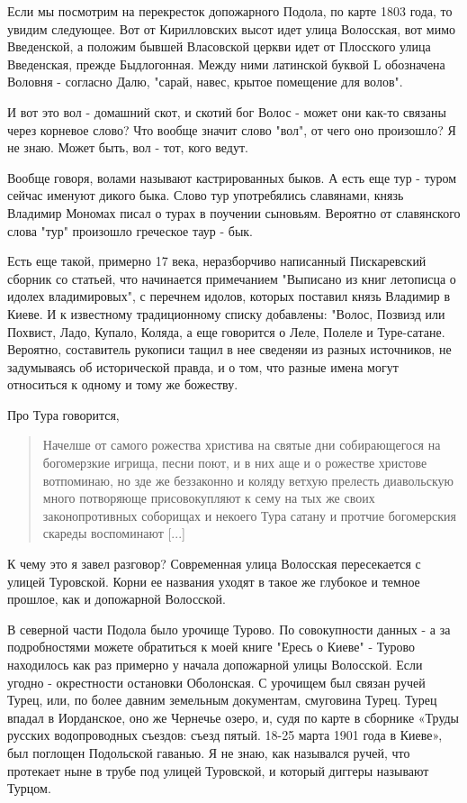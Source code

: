 \documentclass[a5paper,11pt,openany]{article}
\begin{document}
   Если мы посмотрим на перекресток допожарного Подола, по карте 1803 года, то увидим следующее. Вот от Кирилловских высот идет улица Волосская, вот мимо Введенской, а положим бывшей Власовской церкви идет от Плосского улица Введенская, прежде Быдлогонная. Между ними латинской буквой L обозначена Воловня - согласно Далю, "сарай, навес, крытое помещение для волов".

   И вот это вол - домашний скот, и скотий бог Волос - может они как-то связаны через корневое слово? Что вообще значит слово "вол", от чего оно произошло? Я не знаю. Может быть, вол - тот, кого ведут.

   Вообще говоря, волами называют кастрированных быков. А есть еще тур - туром сейчас именуют дикого быка. Слово тур употребялись славянами, князь Владимир Мономах писал о турах в поучении сыновьям. Вероятно от славянского слова "тур" произошло греческое таур - бык.

   Есть еще такой, примерно 17 века, неразборчиво написанный Пискаревский сборник со статьей, что начинается примечанием "Выписано из книг летописца о идолех владимировых", с перечнем идолов, которых поставил князь Владимир в Киеве. И к известному традиционному списку добавлены: "Волос, Позвизд или Похвист, Ладо, Купало, Коляда, а еще говорится о Леле, Полеле и Туре-сатане. Вероятно, составитель рукописи тащил в нее сведеняи из разных источников, не задумываясь об исторической правда, и о том, что разные имена могут относиться к одному и тому же божеству. 

   Про Тура говорится, 

\begin{quotation}
\noindent Начелше от самого рожества христива на святые дни собирающегося на богомерзкие игрища, песни поют, и в них аще и о рожестве христове вотпоминаю, но зде же беззаконно и коляду ветхую прелесть диавольскую много потворяюще присовокупляют к сему на тых же своих законопротивных соборищах и некоего Тура сатану и протчие богомерския скареды воспоминают [...]
\end{quotation}

   К чему это я завел разговор? Современная улица Волосская пересекается с улицей Туровской. Корни ее названия уходят в такое же глубокое и темное прошлое, как и допожарной Волосской.

   В северной части Подола было урочище Турово. По совокупности данных - а за подробностями можете обратиться к моей книге "Ересь о Киеве" - Турово находилось как раз примерно у начала допожарной улицы Волосской. Если угодно - окрестности остановки Оболонская. С урочищем был связан ручей Турец, или, по более давним земельным документам, смуговина Турец. Турец впадал в Иорданское, оно же Чернечье озеро, и, судя по карте в сборнике «Труды русских водопроводных съездов: съезд пятый. 18-25 марта 1901 года в Киеве», был поглощен Подольской гаванью. Я не знаю, как назывался ручей, что протекает ныне в трубе под улицей Туровской, и который диггеры называют Турцом.
\end{document}
